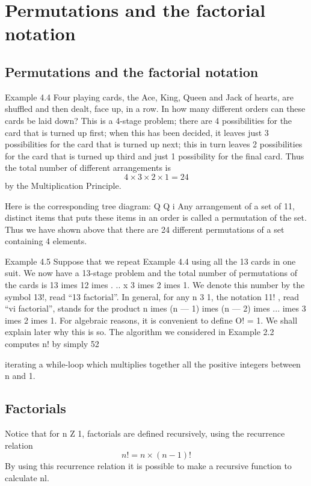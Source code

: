 \documentclass{beamer}
\begin{document}
\section{Permutations and the factorial notation}
\subsection{Permutations and the factorial notation}
Example 4.4 Four playing cards, the Ace, King, Queen and Jack of
hearts, are shuffled and then dealt, face up, in a row. In how many
different orders can these cards be laid down?
\bigskip
This is a 4-stage problem; there are 4 possibilities for the card that is
turned up ﬁrst; when this has been decided, it leaves just 3
possibilities for the card that is turned up next; this in turn leaves 2
possibilities for the card that is turned up third and just 1 possibility
for the ﬁnal card. Thus the total number of different arrangements
is \[4 \times 3 \times 2 \times 1 =24\] by the Multiplication Principle. 

Here is the
corresponding tree diagram:
Q
Q
i
Any arrangement of a set of 11, distinct items that puts these items in
an order is called a permutation of the set. Thus we have shown
above that there are 24 different permutations of a set containing 4
elements.

Example 4.5 Suppose that we repeat Example 4.4 using all the 13
cards in one suit. We now have a 13-stage problem and the total
number of permutations of the cards is 13 	imes 12 	imes . .. x 3 	imes 2 	imes 1. We
denote this number by the symbol 13!, read “13 factorial”.
In general, for any n 3 1, the notation 11! , read “vi factorial”, stands
for the product n 	imes (n — 1) 	imes (n — 2) 	imes ... 	imes 3 	imes 2 	imes 1. For algebraic
reasons, it is convenient to deﬁne
O! = 1.
We shall explain later why this is so.
The algorithm we considered in Example 2.2 computes n! by simply
52



iterating a while-loop which multiplies together all the positive
integers between n and 1.


\subsection{Factorials}
Notice that for n Z 1, factorials are deﬁned recursively, using the
recurrence relation
\[n! = n \times (n-1)! \] 
By using this recurrence relation it is possible to make a recursive
function to calculate nl.
\end{document}
